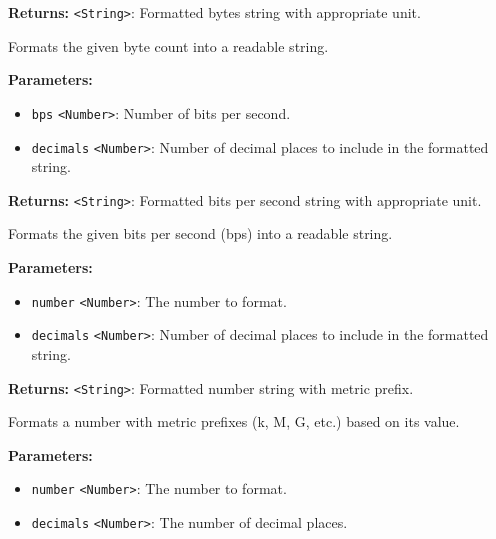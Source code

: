 \documentclass[12pt,a4paper]{article}
\begin{document}
\noindent \textbf{Returns:} \texttt{<String>}: Formatted bytes string with appropriate unit.

\noindent Formats the given byte count into a readable string.

\vspace{5mm}
\noindent {}


\noindent \textbf{Parameters:}
\begin{itemize}
  \item \texttt{bps} \texttt{<Number>}: Number of bits per second.
  \item \texttt{decimals} \texttt{<Number>}: Number of decimal places to include in the formatted string.
\end{itemize}

\noindent \textbf{Returns:} \texttt{<String>}: Formatted bits per second string with appropriate unit.

\noindent Formats the given bits per second (bps) into a readable string.

\vspace{5mm}
\noindent {}


\noindent \textbf{Parameters:}
\begin{itemize}
  \item \texttt{number} \texttt{<Number>}: The number to format.
  \item \texttt{decimals} \texttt{<Number>}: Number of decimal places to include in the formatted string.
\end{itemize}

\noindent \textbf{Returns:} \texttt{<String>}: Formatted number string with metric prefix.

\noindent Formats a number with metric prefixes (k, M, G, etc.) based on its value.

\vspace{5mm}
\noindent {}


\noindent \textbf{Parameters:}
\begin{itemize}
  \item \texttt{number} \texttt{<Number>}: The number to format.
  \item \texttt{decimals} \texttt{<Number>}: The number of decimal places.
\end{itemize}
\end{document}
